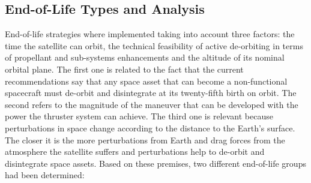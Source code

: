 \subsection{End-of-Life Types and Analysis}

End-of-life strategies where implemented taking into account three factors: the time the satellite can orbit, the technical feasibility of active de-orbiting in terms of propellant and sub-systems enhancements and the altitude of its nominal orbital plane. 
\newline
\newline
The first one is related to the fact that the current recommendations say that any space asset that can become a non-functional spacecraft must de-orbit and disintegrate at its twenty-fifth birth on orbit. The second refers to the magnitude of the maneuver that can be developed with the power the thruster system can achieve. The third one is relevant because perturbations in space change according to the distance to the Earth’s surface. The closer it is the more perturbations from Earth and drag forces from the atmosphere the satellite suffers and perturbations help to de-orbit and disintegrate space assets.
\newline
\newline
Based on these premises, two different end-of-life groups had been determined: 

